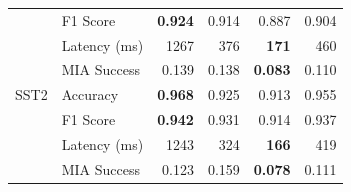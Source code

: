 \begin{table}[t]
\begin{tabular}{llrrrr}
 & F1 Score & \textbf{0.924} & 0.914 & 0.887 & 0.904 \\
 & Latency (ms) & 1267 & 376 & \textbf{171} & 460 \\
 & MIA Success & 0.139 & 0.138 & \textbf{0.083} & 0.110 \\
\midrule
SST2 & Accuracy & \textbf{0.968} & 0.925 & 0.913 & 0.955 \\
 & F1 Score & \textbf{0.942} & 0.931 & 0.914 & 0.937 \\
 & Latency (ms) & 1243 & 324 & \textbf{166} & 419 \\
 & MIA Success & 0.123 & 0.159 & \textbf{0.078} & 0.111 \\
\midrule
\bottomrule
\end{tabular}
\end{table}